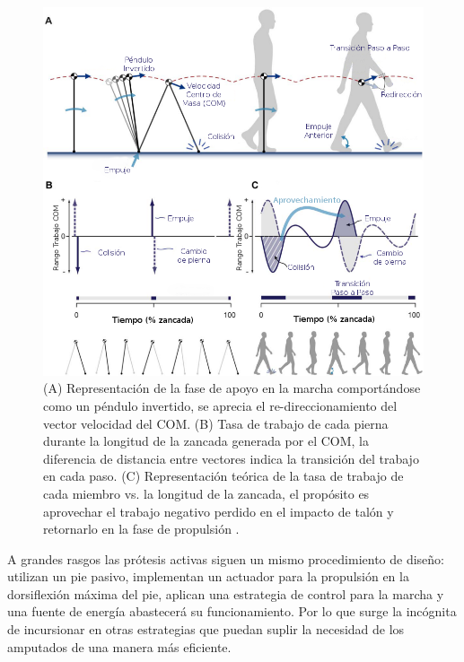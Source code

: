 \documentclass[12pt,english]{article}
\begin{document}
\begin{figure}
\begin{centering}
\includegraphics[scale=0.57]{Recycled}
\par\end{centering}

\caption{\label{fig:(A)-Representaci=0000F3n-de}(A) Representación de la fase
de apoyo en la marcha comportándose como un péndulo invertido, se
aprecia el re-direccionamiento del vector velocidad del COM. (B) Tasa
de trabajo de cada pierna durante la longitud de la zancada generada
por el COM, la diferencia de distancia entre vectores indica la transición
del trabajo en cada paso. (C) Representación teórica de la tasa de
trabajo de cada miembro vs. la longitud de la zancada, el propósito
es aprovechar el trabajo negativo perdido en el impacto de talón y
retornarlo en la fase de propulsión \cite{Collins2010}.}


\end{figure}


A grandes rasgos las prótesis activas siguen un mismo procedimiento
de diseño: utilizan un pie pasivo, implementan un actuador para la
propulsión en la dorsiflexión máxima del pie, aplican una estrategia
de control para la marcha y una fuente de energía abastecerá su funcionamiento.
Por lo que surge la incógnita de incursionar en otras estrategias
que puedan suplir la necesidad de los amputados de una manera más
eficiente.
\end{document}
